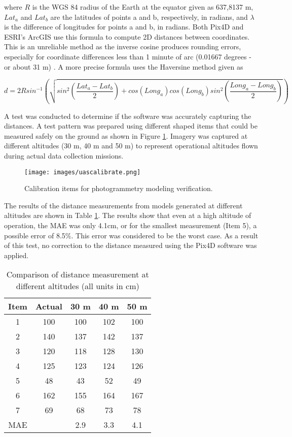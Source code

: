 \noindent
where $R$ is the WGS 84 radius of the Earth at the equator given as 637,8137 m, $Lat_{a}$ and $Lat_{b}$ are the latitudes of points a and b, respectively, in radians, and $\lambda$ is the difference of longitudes for points a and b, in radians.  Both Pix4D and ESRI's ArcGIS use this formula to compute 2D distances between coordinates. This is an unreliable method as the inverse cosine produces rounding errors, especially for coordinate differences less than 1 minute of arc (0.01667 degrees - or about 31 m) \citep{Sinnott1984}. A more precise formula uses the Haversine method given as 

\begin{equation}
\label{eq:distHaversine}
d = 2Rsin^{-1}\left (\sqrt{ sin^{2}\left ( \frac{Lat_{a}-Lat_{b}}{2} \right ) + cos(Long_{a})cos(Long_{b})sin^{2} \left ( \frac{Long_{a}-Long_{b}}{2} \right ) } \right )
\end{equation}

A test was conducted to determine if the software was accurately capturing the distances. A test pattern was prepared using different shaped items that could be measured safely on the ground as shown in Figure \ref{fig:uascalibration}. Imagery was captured at different altitudes (30 m, 40 m and 50 m) to represent operational altitudes flown during actual data collection missions.

\begin{figure}[H]
\texttt{[image: images/uascalibrate.png]} 
\caption{Calibration items for photogrammetry modeling verification.}
\label{fig:uascalibration}
\end{figure}

The results of the distance measurements from models generated at different altitudes are shown in Table \ref{tab:uascalibrate}. The results show that even at a high altitude of operation, the MAE was only 4.1cm, or for the smallest measurement (Item 5), a possible error of 8.5\%. This error was considered to be the worst case. As a result of this test, no correction to the distance measured using the Pix4D software was applied.

%
\begin{table}[H]
\centering
\caption[Comparison of distance measurement at different altitudes]{Comparison of distance measurement at different altitudes (all units in cm)}
\label{tab:uascalibrate}
\begin{tabular}{@{}ccccc@{}}
\toprule
\textbf{Item} & \textbf{Actual} & \textbf{30 m} & \textbf{40 m} & \textbf{50 m} \\ \midrule
1 & 100 & 100 & 102 & 100 \\
2 & 140 & 137 & 142 & 137 \\
3 & 120 & 118 & 128 & 130 \\
4 & 125 & 123 & 124 & 126 \\
5 & 48 & 43 & 52 & 49 \\
6 & 162 & 155 & 164 & 167 \\
7 & 69 & 68 & 73 & 78 \\
MAE &  & 2.9 & 3.3 & 4.1 \\ \bottomrule
\end{tabular}
\end{table}

